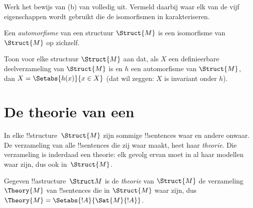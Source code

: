 \documentclass[openany]{memoir}
\begin{document}
\begin{prob}
Werk het bewijs van (b) van  volledig
uit. Vermeld daarbij waar elk van de vijf eigenschappen wordt gebruikt
die de isomorfismen in 
karakteriseren.
\end{prob}

\begin{defn}
Een \emph{automorfisme} van een structuur $\Struct{M}$ is een isomorfisme
van $\Struct{M}$ op zichzelf.
\end{defn}

\begin{prob}
Toon voor elke structuur $\Struct{M}$ aan dat, als $X$ een definieerbare
deelverzameling van $\Struct{M}$ is en $h$ een automorfisme van
$\Struct{M}$, dan $X = \Setabs{h(x)}{x \in X}$ (dat wil zeggen: $X$ is
invariant onder $h$).
\end{prob}
\endgroup

\begingroup
\def\olfilename{OLP-0188}
\def\olfilepath{content/model-theory/basics/}
\hypertarget{unit-OLP-0188}{}




\section{De theorie van een }

In elke !!{structure}~$\Struct{M}$ zijn sommige !!{sentence}s waar en
andere onwaar. De verzameling van alle !!{sentence}s die zij waar maakt,
heet haar \emph{theorie}. Die verzameling is inderdaad een theorie: elk
gevolg ervan moet in al haar modellen waar zijn, dus ook in~$\Struct{M}$.

\begin{defn}
  Gegeven !!a{structure}~$\Struct M$ is de \emph{theorie} van
  $\Struct{M}$ de verzameling $\Theory{M}$ van !!{sentence}s
  die in $\Struct{M}$ waar zijn, dus $\Theory{M} =
  \Setabs{!A}{\Sat{M}{!A}}$.
\end{defn}
\end{document}
